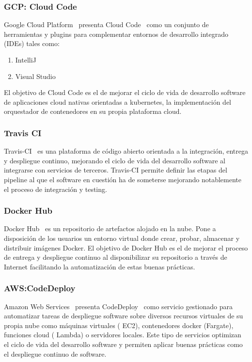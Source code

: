 \documentclass[a4paper,11pt]{book}
\begin{document}
\subsubsection{GCP: Cloud Code}

Google Cloud Platform~\cite{gcp} presenta Cloud Code~\cite{gcpcode} como un conjunto de herramientas y plugins para complementar entornos de desarrollo integrado (IDEs)  tales como: 

\begin{enumerate}
\item IntelliJ 
\item Visual Studio
\end{enumerate}

El objetivo de Cloud Code es el de mejorar el ciclo de vida de desarrollo software de aplicaciones cloud  nativas orientadas a kubernetes,  la implementación del orquestador de contenedores en su propia plataforma cloud. 

\subsubsection{Travis CI}

Travis-CI~\cite{travis} es una plataforma de código abierto orientada a la integración, entrega y despliegue continuo, mejorando el ciclo de vida del desarrollo software al integrarse con servicios de terceros. Travis-CI permite definir las etapas del pipeline al que el software en cuestión ha de someterse mejorando notablemente el proceso de integración y testing. 

\subsubsection{Docker Hub}

Docker Hub~\cite{dhub} es un repositorio de artefactos alojado en la nube. Pone a disposición de los usuarios un entorno virtual donde crear, probar, almacenar y distribuir imágenes Docker. El objetivo de Docker Hub es el de mejorar el proceso de entrega y despliegue continuo al disponibilizar su repositorio a través de Internet facilitando la automatización de estas buenas prácticas. 

\subsubsection{AWS:CodeDeploy}

Amazon Web Services~\cite{aws} presenta  CodeDeploy~\cite{awscode} como servicio gestionado para automatizar tareas de despliegue software sobre diversos recursos virtuales de su propia nube como máquinas virtuales ( EC2), contenedores docker (Fargate), funciones cloud ( Lambda) o servidores locales. Este tipo de servicios optimizan el ciclo de vida del desarrollo software y permiten aplicar buenas prácticas como el despliegue continuo de software. 
\end{document}
